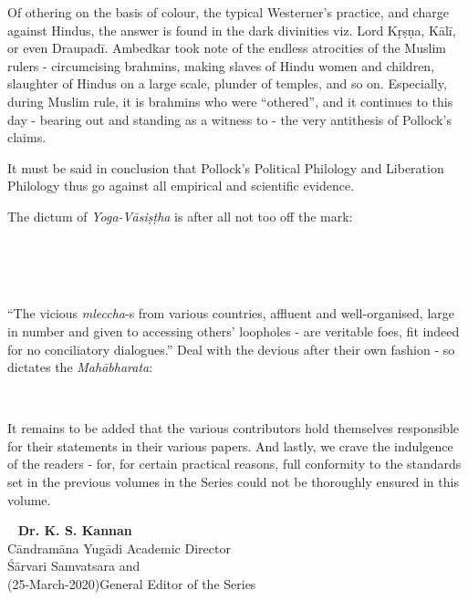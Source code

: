 
Of othering on the basis of colour, the typical Westerner’s practice, and charge against Hindus, the answer is found in the dark divinities viz. Lord Kṛṣṇa, Kālī, or even Draupadī. Ambedkar took note of the endless atrocities of the Muslim rulers - circumcising brahmins, making slaves of Hindu women and children, slaughter of Hindus on a large scale, plunder of temples, and so on. Especially, during Muslim rule, it is brahmins who were “othered”, and it continues to this day - bearing out and standing as a witness to - the very antithesis of Pollock’s claims.

It must be said in conclusion that Pollock’s Political Philology and Liberation Philology thus go against all empirical and scientific evidence.

The dictum of \textit{Yoga-Vāsiṣṭha} is after all not too off the mark:
\begin{center}
 \\\\ \\
\end{center}

“The vicious \textit{mleccha}-s from various countries, affluent and well-organised, large in number and given to accessing others’ loopholes - are veritable foes, fit indeed for no conciliatory dialogues.” Deal with the devious after their own fashion - so dictates the \textit{Mahābharata}:
\begin{center}
\\
\end{center}

It remains to be added that the various contributors hold themselves responsible for their statements in their various papers. And lastly, we crave the indulgence of the readers - for, for certain practical reasons, full conformity to the standards set in the previous volumes in the Series could not be thoroughly ensured in this volume.


\vspace{0.35cm}

 \phantom{a}~ \hfill \textbf{Dr. K. S. Kannan}\\
Cāndramāna Yugādi \hfill Academic Director\\
Śārvari Samvatsara \hfill and\\
(25-March-2020)\hfill General Editor of the Series


